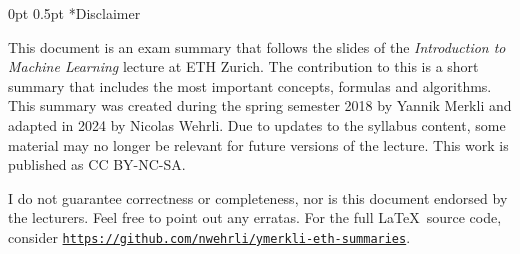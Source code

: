 \documentclass[11pt,landscape,a4paper,fleqn]{article}
\makeatletter
\renewcommand{\section}{\@startsection{section}{1}{0mm}%
                                {0pt}%
                                {0.5pt}%
                                {\color{myorange}\sffamily\small\bfseries}}
\makeatother
\begin{document}
	
\section*{Disclaimer}

\small
\begin{multicols*}{4}
	
This document is an exam summary that follows the slides of the \textit{Introduction to Machine Learning} lecture  at ETH Zurich. 
The contribution to this is a short summary that includes the most important concepts, formulas and algorithms. 
This summary was created during the spring semester 2018 by Yannik Merkli and adapted in 2024 by Nicolas Wehrli. 
Due to updates to the syllabus content, some material may no longer be relevant for future versions of the 
lecture. This work is published as CC BY-NC-SA.

\begin{center}
	\ccbyncsa
\end{center}

I do not guarantee correctness or completeness, nor is this document endorsed by the lecturers. 
Feel free to point out any erratas. 
For the full \LaTeX \ source code, consider \texttt{\href{https://github.com/nwehrli/ymerkli-eth-summaries}{https://github.com/nwehrli/ymerkli-eth-summaries}}.

\newpage
	
%




% 









\end{multicols*}
\end{document}
